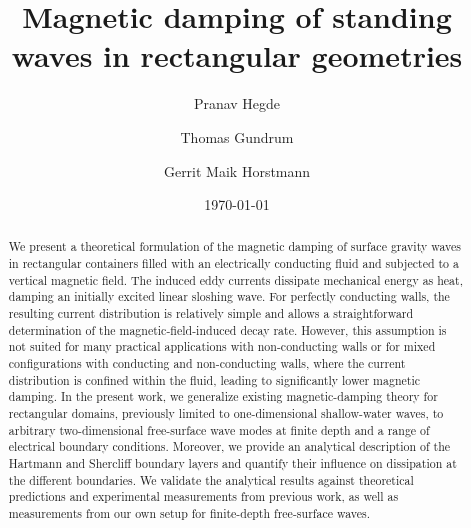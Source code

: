 \documentclass[aps,prfluids,reprint,superscriptaddress]{revtex4-2}
\begin{document}

\title{Magnetic damping of standing waves in rectangular geometries}


\author{Pranav Hegde}
\author{Thomas Gundrum}
\author{Gerrit Maik Horstmann}


\date{\today}

\begin{abstract}
We present a theoretical formulation of the magnetic damping of surface gravity waves in rectangular containers filled with an electrically conducting fluid and subjected to a vertical magnetic field. The induced eddy currents dissipate mechanical energy as heat, damping an initially excited linear sloshing wave. For perfectly conducting walls, the resulting current distribution is relatively simple and allows a straightforward determination of the magnetic-field-induced decay rate. However, this assumption is not suited for many practical applications with non-conducting walls or for mixed configurations with conducting and non-conducting walls, where the current distribution is confined within the fluid, leading to significantly lower magnetic damping. In the present work, we generalize existing magnetic-damping theory for rectangular domains, previously limited to one-dimensional shallow-water waves, to arbitrary two-dimensional free-surface wave modes at finite depth and a range of electrical boundary conditions. Moreover, we provide an analytical description of the Hartmann and Shercliff boundary layers and quantify their influence on dissipation at the different boundaries. We validate the analytical results against theoretical predictions and experimental measurements from previous work, as well as measurements from our own setup for finite-depth free-surface waves. 
\end{abstract}
\end{document}
